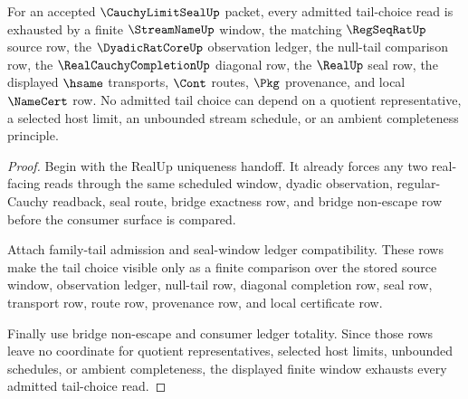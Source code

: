 \begin{theorem}
\label{thm:cauchy-limit-seal-tail-choice-exhaustion}
For an accepted $\CauchyLimitSealUp$ packet, every admitted tail-choice read is exhausted by a finite $\StreamNameUp$ window, the matching $\RegSeqRatUp$ source row, the $\DyadicRatCoreUp$ observation ledger, the null-tail comparison row, the $\RealCauchyCompletionUp$ diagonal row, the $\RealUp$ seal row, the displayed $\hsame$ transports, $\Cont$ routes, $\Pkg$ provenance, and local $\NameCert$ row. No admitted tail choice can depend on a quotient representative, a selected host limit, an unbounded stream schedule, or an ambient completeness principle.
\end{theorem}
\begin{proof}
Begin with the RealUp uniqueness handoff. It already forces any two real-facing reads through the same scheduled window, dyadic observation, regular-Cauchy readback, seal route, bridge exactness row, and bridge non-escape row before the consumer surface is compared.

Attach family-tail admission and seal-window ledger compatibility. These rows make the tail choice visible only as a finite comparison over the stored source window, observation ledger, null-tail row, diagonal completion row, seal row, transport row, route row, provenance row, and local certificate row.

Finally use bridge non-escape and consumer ledger totality. Since those rows leave no coordinate for quotient representatives, selected host limits, unbounded schedules, or ambient completeness, the displayed finite window exhausts every admitted tail-choice read.
\end{proof}

